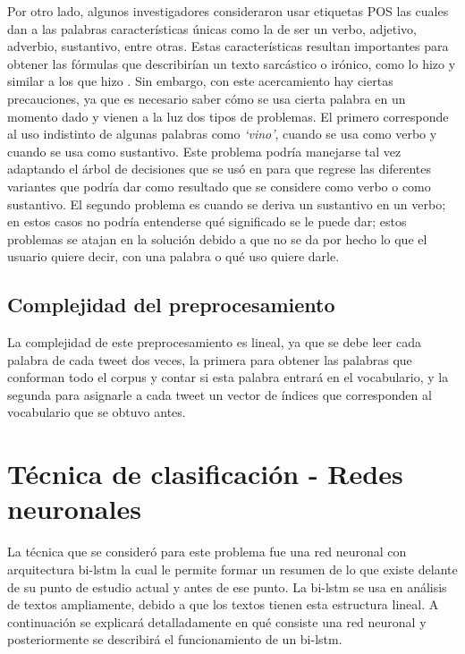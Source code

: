 \par Por otro lado, algunos investigadores consideraron usar etiquetas \gls{POS} las cuales dan a las palabras características únicas como la de ser un verbo, adjetivo, adverbio, sustantivo, entre otras. Estas características resultan importantes para obtener las fórmulas que describirían un texto sarcástico o irónico, como lo hizo \textcite{barbieri2014italian} y similar a los que hizo \textcite{davidov2010semi}. Sin embargo, con este acercamiento hay ciertas precauciones, ya que es necesario saber cómo se usa cierta palabra en un momento dado y vienen a la luz dos tipos de problemas. El primero corresponde al uso indistinto de algunas palabras como \textit{`vino'}, cuando se usa como verbo y cuando se usa como sustantivo. Este problema podría manejarse tal vez adaptando el árbol de decisiones que se usó en \textcite{barbieri2014italian} para que regrese las diferentes variantes que podría dar como resultado que se considere como verbo o como sustantivo. El segundo problema es cuando se deriva un sustantivo en un verbo; en estos casos no podría entenderse qué significado se le puede dar; estos problemas se atajan en la solución debido a que no se da por hecho lo que el usuario quiere decir, con una palabra o qué uso quiere darle.


\subsection{Complejidad del preprocesamiento}

La complejidad de este preprocesamiento es lineal, ya que se debe leer cada palabra de cada tweet dos veces, la primera para obtener las palabras que conforman todo el corpus y contar si esta palabra entrará en el vocabulario, y la segunda para asignarle a cada tweet un vector de índices que corresponden al vocabulario que se obtuvo antes.


\section{Técnica de clasificación - Redes neuronales}

\par La técnica que se consideró para este problema fue una red neuronal con arquitectura \gls{bi-lstm} la cual le permite formar un resumen de lo que existe delante de su punto de estudio actual y antes de ese punto. La \gls{bi-lstm} se usa en análisis de textos ampliamente, debido a que los textos tienen esta estructura lineal. A continuación se explicará detalladamente en qué consiste una red neuronal y posteriormente se describirá el funcionamiento de un \gls{bi-lstm}.

